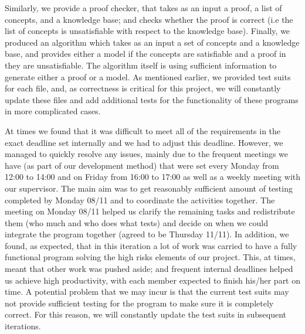 Similarly, we provide a proof checker, that takes as an input a proof, a list of concepts, and a knowledge base; and checks whether the proof is correct (i.e the list of concepts is unsatisfiable with respect to the knowledge base). Finally, we produced an algorithm which takes as an input a set of concepts and a knowledge base, and provides either a model if the concepts are satisfiable and a proof in they are unsatisfiable. The algorithm itself is using sufficient information to generate either a proof or a model. As mentioned earlier, we provided test suits for each file, and, as correctness is critical for this project, we will constantly update these files and add additional tests for the functionality of these programs in more complicated cases.  

At times we found that it was difficult to meet all of the requirements in the exact deadline set internally and we had to adjust this deadline. However, we managed to quickly resolve any issues, mainly due to the frequent meetings we have (as part of our development method) that were set every Monday from 12:00 to 14:00 and on Friday from 16:00 to 17:00 as well as a weekly meeting with our supervisor. The main aim was to get reasonably sufficient amount of testing completed by Monday 08/11 and to coordinate the activities together. The meeting on Monday 08/11 helped us clarify the remaining tasks and redistribute them (who much and who does what tests) and decide on when we could integrate the program together (agreed to be Thursday 11/11). In addition, we found, as expected, that in this iteration a lot of work was carried to have a fully functional program solving the high risks elements of our project. This, at times, meant that other work was pushed aside; and frequent internal deadlines helped us achieve high productivity, with each member expected to finish his/her part on time. A potential problem that we may incur is that the current test suits may not provide sufficient testing for the program to make sure it is completely correct. For this reason, we will constantly update the test suits in subsequent iterations.

